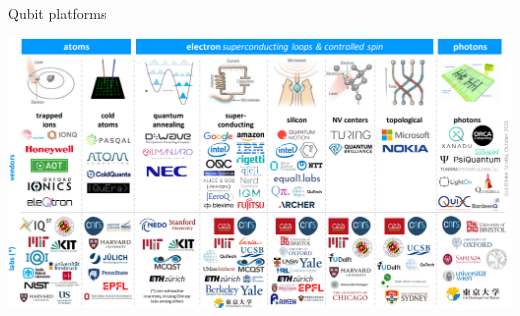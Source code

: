 \documentclass[aspectratio=169,10pt]{beamer}
\begin{document}
\begin{frame}{Qubit platforms}
  \begin{center}
      \includegraphics[height=0.82\textheight]{figures/platforms.png}
  \end{center}
\end{frame}
\end{document}

